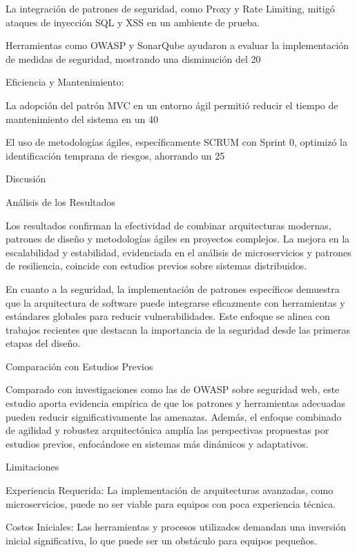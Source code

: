 \documentclass[12pt]{article}
\begin{document}
La integración de patrones de seguridad, como Proxy y Rate Limiting, mitigó ataques de inyección SQL y XSS en un ambiente de prueba.

Herramientas como OWASP y SonarQube ayudaron a evaluar la implementación de medidas de seguridad, mostrando una disminución del 20%

Eficiencia y Mantenimiento:

La adopción del patrón MVC en un entorno ágil permitió reducir el tiempo de mantenimiento del sistema en un 40%

El uso de metodologías ágiles, específicamente SCRUM con Sprint 0, optimizó la identificación temprana de riesgos, ahorrando un 25%

Discusión

Análisis de los Resultados

Los resultados confirman la efectividad de combinar arquitecturas modernas, patrones de diseño y metodologías ágiles en proyectos complejos. La mejora en la escalabilidad y estabilidad, evidenciada en el análisis de microservicios y patrones de resiliencia, coincide con estudios previos sobre sistemas distribuidos.

En cuanto a la seguridad, la implementación de patrones específicos demuestra que la arquitectura de software puede integrarse eficazmente con herramientas y estándares globales para reducir vulnerabilidades. Este enfoque se alinea con trabajos recientes que destacan la importancia de la seguridad desde las primeras etapas del diseño.

Comparación con Estudios Previos

Comparado con investigaciones como las de OWASP sobre seguridad web, este estudio aporta evidencia empírica de que los patrones y herramientas adecuadas pueden reducir significativamente las amenazas. Además, el enfoque combinado de agilidad y robustez arquitectónica amplía las perspectivas propuestas por estudios previos, enfocándose en sistemas más dinámicos y adaptativos.

Limitaciones

Experiencia Requerida: La implementación de arquitecturas avanzadas, como microservicios, puede no ser viable para equipos con poca experiencia técnica.

Costos Iniciales: Las herramientas y procesos utilizados demandan una inversión inicial significativa, lo que puede ser un obstáculo para equipos pequeños.
\end{document}
